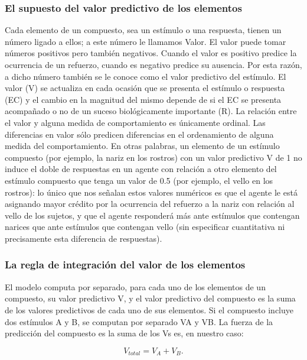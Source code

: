 \documentclass[
  letterpaper,
]{book}
\begin{document}
\subsubsection{El supuesto del valor predictivo de los
elementos}\label{el-supuesto-del-valor-predictivo-de-los-elementos}

Cada elemento de un compuesto, sea un estímulo o una respuesta, tienen
un número ligado a ellos; a este número le llamamos Valor. El valor
puede tomar números positivos pero también negativos. Cuando el valor es
positivo predice la ocurrencia de un refuerzo, cuando es negativo
predice su ausencia. Por esta razón, a dicho número también se le conoce
como el valor predictivo del estímulo. El valor (V) se actualiza en cada
ocasión que se presenta el estímulo o respuesta (EC) y el cambio en la
magnitud del mismo depende de si el EC se presenta acompañado o no de un
suceso biológicamente importante (R). La relación entre el valor y
alguna medida de comportamiento es únicamente ordinal. Las diferencias
en valor sólo predicen diferencias en el ordenamiento de alguna medida
del comportamiento. En otras palabras, un elemento de un estímulo
compuesto (por ejemplo, la nariz en los rostros) con un valor predictivo
V de 1 no induce el doble de respuestas en un agente con relación a otro
elemento del estímulo compuesto que tenga un valor de 0.5 (por ejemplo,
el vello en los rostros): lo único que nos señalan estos valores
numéricos es que el agente le está asignando mayor crédito por la
ocurrencia del refuerzo a la nariz con relación al vello de los sujetos,
y que el agente responderá más ante estímulos que contengan narices que
ante estímulos que contengan vello (sin especificar cuantitativa ni
precisamente esta diferencia de respuestas).

\subsubsection{La regla de integración del valor de los
elementos}\label{la-regla-de-integraciuxf3n-del-valor-de-los-elementos}

El modelo computa por separado, para cada uno de los elementos de un
compuesto, su valor predictivo V, y el valor predictivo del compuesto es
la suma de los valores predictivos de cada uno de sus elementos. Si el
compuesto incluye dos estímulos A y B, se computan por separado VA y VB.
La fuerza de la predicción del compuesto es la suma de los Vs es, en
nuestro caso:

\[
V_{total} = V_{A}+ V_{B}. 
\]
\end{document}
